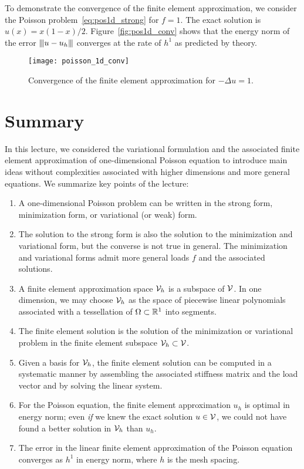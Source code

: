 To demonstrate the convergence of the finite element approximation, we consider the Poisson problem~\eqref{eq:pos1d_strong} for $f = 1$. The exact solution is $u(x) = x(1-x)/2$. Figure~\eqref{fig:pos1d_conv} shows that the energy norm of the error $|\kern-1pt|\kern-1pt| u - u_h |\kern-1pt|\kern-1pt|$ converges at the rate of $h^1$ as predicted by theory.
\begin{figure}
  \centering
  \texttt{[image: poisson\_1d\_conv]}
  \caption{Convergence of the finite element approximation for $-\Delta u = 1$.}
  \label{fig:pos1d_conv}
\end{figure}

\section{Summary}
In this lecture, we considered the variational formulation and the associated finite element approximation of one-dimensional Poisson equation to introduce main ideas without complexities associated with higher dimensions and more general equations.  We summarize key points of the lecture:
\begin{enumerate}
\item A one-dimensional Poisson problem can be written in the strong form, minimization form, or variational (or weak) form. 
\item The solution to the strong form is also the solution to the minimization and variational form, but the converse is not true in general.  The minimization and variational forms admit more general loads $f$ and the associated solutions.
\item A finite element approximation space $\mathcal{V}_h$ is a subspace of $\mathcal{V}$.  In one dimension, we may choose $\mathcal{V}_h$ as the space of piecewise linear polynomials associated with a tessellation of $\Omega \subset \mathbb{R}^1$ into segments.
\item The finite element solution is the solution of the minimization or variational problem in the finite element subspace $\mathcal{V}_h \subset \mathcal{V}$.
\item Given a basis for $\mathcal{V}_h$, the finite element solution can be computed in a systematic manner by assembling the associated stiffness matrix and the load vector and by solving the linear system.
\item For the Poisson equation, the finite element approximation $u_h$ is optimal in energy norm; even \emph{if} we knew the exact solution $u \in \mathcal{V}$, we could not have found a better solution in $\mathcal{V}_h$ than $u_h$.
\item The error in the linear finite element approximation of the Poisson equation converges as $h^1$ in energy norm, where $h$ is the mesh spacing.
\end{enumerate}
